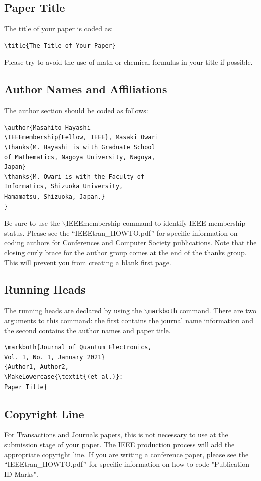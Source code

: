 \documentclass[lettersize,journal]{IEEEtran}
\begin{document}
\subsection{Paper Title}
\noindent The title of your paper is coded as:

\begin{verbatim}
\title{The Title of Your Paper}
\end{verbatim}

\noindent Please try to avoid the use of math or chemical formulas in your title if possible.

\subsection{Author Names and Affiliations}
\noindent The author section should be coded as follows:
\begin{verbatim}
\author{Masahito Hayashi 
\IEEEmembership{Fellow, IEEE}, Masaki Owari
\thanks{M. Hayashi is with Graduate School 
of Mathematics, Nagoya University, Nagoya, 
Japan}
\thanks{M. Owari is with the Faculty of 
Informatics, Shizuoka University, 
Hamamatsu, Shizuoka, Japan.}
}
\end{verbatim}
Be sure to use the $\backslash$IEEEmembership command to identify IEEE membership status.
Please see the ``IEEEtran\_HOWTO.pdf'' for specific information on coding authors for Conferences and Computer Society publications. Note that the closing curly brace for the author group comes at the end of the thanks group. This will prevent you from creating a blank first page.

\subsection{Running Heads}
\noindent The running heads are declared by using the $\backslash${\tt{markboth}} command. There are two arguments to this command: the first contains the journal name information and the second contains the author names and paper title.
\begin{verbatim}
\markboth{Journal of Quantum Electronics, 
Vol. 1, No. 1, January 2021}
{Author1, Author2, 
\MakeLowercase{\textit{(et al.)}: 
Paper Title}
\end{verbatim}

\subsection{Copyright Line}
\noindent For Transactions and Journals papers, this is not necessary to use at the submission stage of your paper. The IEEE production process will add the appropriate copyright line. If you are writing a conference paper, please see the ``IEEEtran\_HOWTO.pdf'' for specific information on how to code "Publication ID Marks".
\end{document}

